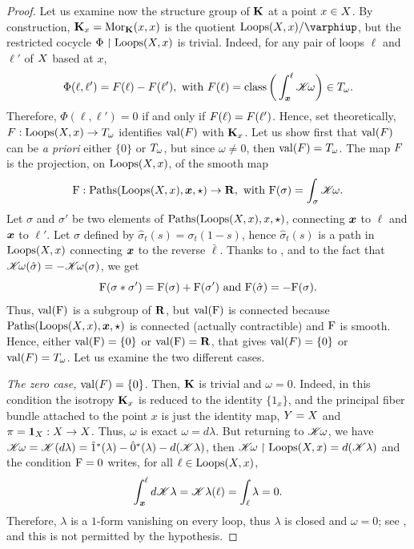\begin{proof}
  Let us examine now the structure group of ${\mathbf K}$ at a point $x \in X$.
  By construction,
  ${\mathbf K}_x = {\operatorname{Mor}}_{{\mathbf K}}(x,x)$ is the quotient $\Loops(\X,x)/\phi$,
  but the restricted cocycle $\Phi \restriction \operatorname{Loops}(X,x)$ is trivial.
  Indeed,
  for any pair of loops $\ell$ and $\ell'$ of $X$ based at $x$,
  $$%
  \Phi(\ell,\ell') = \F(\ell) - \F(\ell'), \text{ with } \F(\ell) = \class\bigg(\int_{\sbmx}^{\ell} \CHK\!\omega\bigg) \in \Torus_\omega.
  $$%
  Therefore,
  $\Phi(\ell,\ell') = 0$ if and only if $F(\ell) = F(\ell')$.
  Hence,
  set theoretically,
  $F : \operatorname{Loops}(X,x) \to T_\omega$ identifies $\mathrm{val}(F)$ with ${\mathbf K}_x$.
  Let us show first that $\mathrm{val}(F)$ can be {\em a priori\/} either $\{0\}$ or $T_\omega$,
  but since $\omega \neq 0$,
  then $\mathrm{val}(F) = T_\omega$.
  The map $F$ is  the projection,
  on $\operatorname{Loops}(X,x)$,
  of the smooth map
  $$%
  \eF : \Paths(\Loops(\X,x),\bmx,\star) \to \RR, \text{ with } \eF(\sigma) = \int_\sigma \CHK\!\omega.
  $$%
  Let $\sigma$ and $\sigma'$ be two elements of $\operatorname{Paths}(\operatorname{Loops}(X,x),x,\star)$,
  connecting ${\boldsymbol x}$ to $\ell$ and ${\boldsymbol x}$ to $\ell'$.
  Let $\hat\sigma$ defined by $\hat\sigma_t(s) =  \sigma_t(1-s)$,
  hence $\hat\sigma_t(s)$ is a path in $\operatorname{Loops}(X,x)$ connecting ${\boldsymbol x}$ to the reverse $\bar\ell$.
  Thanks to ,
  and to the fact that $\mathscr{K}\!\omega(\hat\sigma) = - \mathscr{K}\!\omega(\sigma)$,
  we get
  \begin{equation}
    \renewcommand{\theequation}{$\ast$}
    \eF(\sigma*\sigma') = \eF(\sigma) + \eF(\sigma')
    \text{ and }
    \eF(\hat\sigma) = - \eF(\sigma).
  \end{equation}
  Thus,
  $\mathrm{val}(\mathrm{F})$ is a subgroup of ${\mathbf R}$,
  but $\mathrm{val}(\mathrm{F})$ is connected because $\operatorname{Paths}(\operatorname{Loops}(X,x),{\boldsymbol x},\star)$ is connected (actually contractible) and $\mathrm{F}$ is smooth.
  Hence,
  either $\mathrm{val}(\mathrm{F}) = \{0\}$ or $\mathrm{val}(\mathrm{F}) = {\mathbf R}$,
  that gives $\mathrm{val}(F) = \{0\}$ or $\mathrm{val}(F) = T_\omega$.
  Let us examine the two different cases.
  
  {\em The zero case,} $\mathrm{val}(F) = \{0\}$.
  Then, ${\mathbf K}$ is trivial and $\omega =0$.
  Indeed,
  in this condition the isotropy ${\mathbf K}_x$ is reduced to the identity $\{1_x\}$,
  and the principal fiber bundle attached to the point $x$  is just the identity map,
  $Y = X$ and $\pi = {\bf 1}_X : X \to X$.
  Thus,
  $\omega$ is exact $\omega = d\lambda$.
  But returning to $\mathscr{K}\!\omega$,
  we have $\mathscr{K}\!\omega = \mathscr{K}(d \lambda) = \hat 1^*(\lambda) -\hat 0^*(\lambda) - d(\mathscr{K}\lambda)$,
  then  $\mathscr{K}\!\omega \restriction \operatorname{Loops}(X,x) = d(\mathscr{K}\lambda)$ and the condition $\mathrm{F} = 0$ writes,
  for all $\ell \in \operatorname{Loops}(X,x)$,
  $$%
  \int_\sbmx^\ell d\CHK\lambda = \CHK\lambda(\ell) = \int_\ell \lambda = 0.
  $$%
  Therefore,
  $\lambda$ is a $1$-form vanishing on every loop,
  thus $\lambda$ is closed and $\omega = 0$;
  see ,
  and this is not permitted by the hypothesis.
  

\end{proof}
